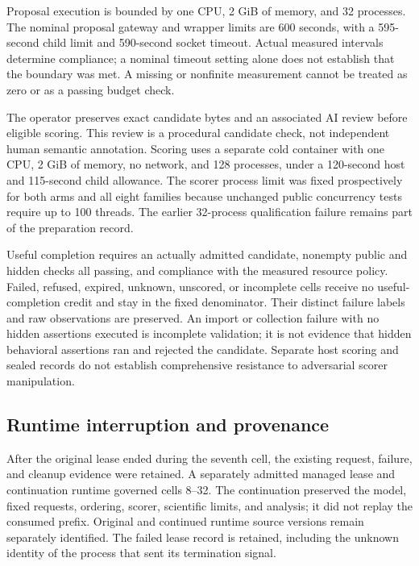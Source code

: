 Proposal execution is bounded by one CPU, 2 GiB of memory, and 32 processes.
The nominal proposal gateway and wrapper limits are 600 seconds, with a
595-second child limit and 590-second socket timeout. Actual measured intervals
determine compliance; a nominal timeout setting alone does not establish that
the boundary was met. A missing or nonfinite measurement cannot be treated as
zero or as a passing budget check.

The operator preserves exact candidate bytes and an associated AI review before
eligible scoring. This review is a procedural candidate check, not independent
human semantic annotation. Scoring uses a separate cold container with one CPU,
2 GiB of memory, no network, and 128 processes, under a 120-second host and
115-second child allowance. The scorer process limit was fixed prospectively
for both arms and all eight families because unchanged public concurrency tests
require up to 100 threads. The earlier 32-process qualification failure remains
part of the preparation record.

Useful completion requires an actually admitted candidate, nonempty public and
hidden checks all passing, and compliance with the measured resource policy.
Failed, refused, expired, unknown, unscored, or incomplete cells receive no
useful-completion credit and stay in the fixed denominator. Their distinct
failure labels and raw observations are preserved. An import or collection
failure with no hidden assertions executed is incomplete validation; it is
not evidence that hidden behavioral assertions ran and rejected the candidate.
Separate host scoring and sealed records do not establish comprehensive
resistance to adversarial scorer manipulation.

\subsection{Runtime interruption and provenance}

After the original lease ended during the seventh cell, the existing request,
failure, and cleanup evidence were retained. A separately admitted managed
lease and continuation runtime governed cells 8--32. The continuation preserved
the model, fixed requests, ordering, scorer, scientific limits, and analysis;
it did not replay the consumed prefix. Original and continued runtime source
versions remain separately identified. The failed lease record is retained,
including the unknown identity of the process that sent its termination signal.

